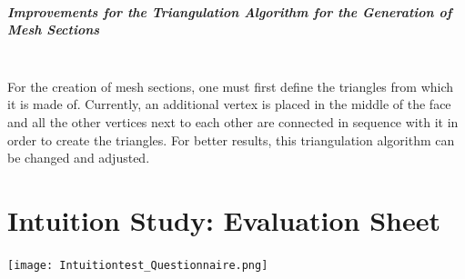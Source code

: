 \documentclass{report}
\begin{document}
	\paragraph{Improvements for the Triangulation Algorithm for the Generation of Mesh Sections} \hfill \\
	For the creation of mesh sections, one must first define the triangles from which it is made of. Currently, an additional vertex is placed in the middle of the face and all the other vertices next to each other are connected in sequence with it in order to create the triangles. For better results, this triangulation algorithm can be changed and adjusted.

\newpage
{}


\appendix
	
\chapter{Intuition Study: Evaluation Sheet} \label{appendix:questionnaire}
	\texttt{[image: Intuitiontest\_Questionnaire.png]}
	
\end{document}
